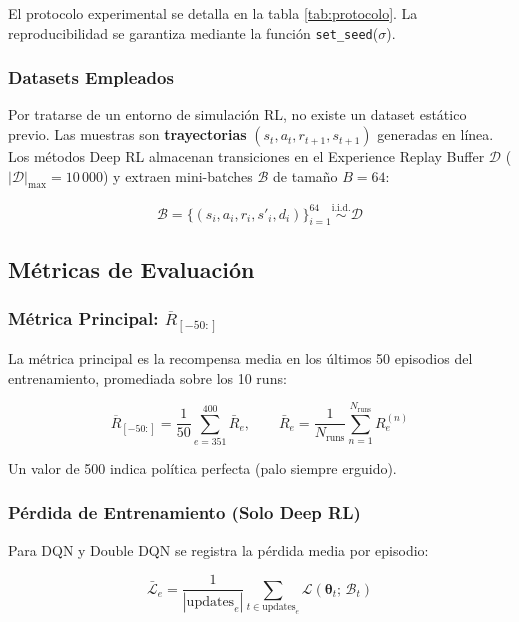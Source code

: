 El protocolo experimental se detalla en la tabla \ref{tab:protocolo}. La reproducibilidad se garantiza mediante la función \texttt{set\_seed}($\sigma$).


\subsubsection{Datasets Empleados}

Por tratarse de un entorno de simulación RL, no existe un dataset estático previo. Las muestras son \textbf{trayectorias} $(s_t, a_t, r_{t+1}, s_{t+1})$ generadas en línea. Los métodos Deep RL almacenan transiciones en el Experience Replay Buffer $\mathcal{D}$ ($|\mathcal{D}|_\max = 10\,000$) y extraen mini-batches $\mathcal{B}$ de tamaño $B = 64$:

\begin{equation}
  \mathcal{B} = \{(s_i, a_i, r_i, s'_i, d_i)\}_{i=1}^{64} \overset{\text{i.i.d.}}{\sim} \mathcal{D}
\end{equation}

\subsection{Métricas de Evaluación}

\subsubsection{Métrica Principal: $\overline{R}_{[-50:]}$}

La métrica principal es la recompensa media en los últimos 50 episodios del entrenamiento, promediada sobre los 10 runs:

\begin{equation}
  \overline{R}_{[-50:]} = \frac{1}{50} \sum_{e=351}^{400} \bar{R}_e, \qquad \bar{R}_e = \frac{1}{N_\text{runs}} \sum_{n=1}^{N_\text{runs}} R_e^{(n)}
\end{equation}

Un valor de 500 indica política perfecta (palo siempre erguido).

\subsubsection{Pérdida de Entrenamiento (Solo Deep RL)}

Para DQN y Double DQN se registra la pérdida media por episodio:

\begin{equation}
  \bar{\mathcal{L}}_e = \frac{1}{|\text{updates}_e|} \sum_{t \in \text{updates}_e} \mathcal{L}(\boldsymbol{\theta}_t;\, \mathcal{B}_t)
\end{equation}

